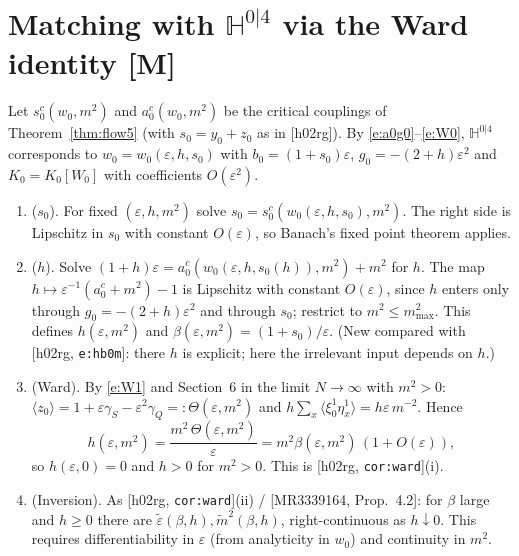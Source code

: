 \documentclass[11pt]{article}
\theoremstyle{remark}
\theoremstyle{definition}
\newcommand{\HH}{\mathbb{H}}
\newcommand{\avg}[1]{\langle #1\rangle}
\newcommand{\st}[1]{\textsf{[#1]}}
\newcommand{\hr}[1]{\textup{[h02rg, \texttt{#1}]}}
\begin{document}
\section{Matching with $\HH^{0|4}$ via the Ward identity \st{M}}

Let $s_0^c(w_0,m^2)$ and $a_0^c(w_0,m^2)$ be the critical couplings of Theorem~\ref{thm:flow5}
(with $s_0=y_0+z_0$ as in [h02rg]). By \eqref{e:a0g0}--\eqref{e:W0}, $\HH^{0|4}$ corresponds to
$w_0=w_0(\varepsilon,h,s_0)$ with $b_0=(1+s_0)\varepsilon$, $g_0=-(2+h)\varepsilon^2$ and $K_0=K_0[W_0]$ with coefficients $O(\varepsilon^2)$.

\begin{enumerate}[label=\textbf{Step \arabic*.}, leftmargin=*]
\item ($s_0$). For fixed $(\varepsilon,h,m^2)$ solve $s_0=s_0^c(w_0(\varepsilon,h,s_0),m^2)$. The right side is Lipschitz in $s_0$
  with constant $O(\varepsilon)$, so Banach's fixed point theorem applies.
\item ($h$). Solve $(1+h)\varepsilon=a_0^c(w_0(\varepsilon,h,s_0(h)),m^2)+m^2$ for $h$. The map
  $h\mapsto\varepsilon^{-1}(a_0^c+m^2)-1$ is Lipschitz with constant $O(\varepsilon)$, since $h$ enters only through
  $g_0=-(2+h)\varepsilon^2$ and through $s_0$; restrict to $m^2\le m^2_{\max}$. This defines $h(\varepsilon,m^2)$ and $\beta(\varepsilon,m^2)=(1+s_0)/\varepsilon$.
  (New compared with \hr{e:hb0m}: there $h$ is explicit; here the irrelevant input depends on $h$.)
\item (Ward). By \eqref{e:W1} and Section~6 in the limit $N\to\infty$ with $m^2>0$:
  $\avg{z_0}=1+\varepsilon\gamma_S-\varepsilon^2\gamma_Q=:\Theta(\varepsilon,m^2)$ and
  $h\sum_x\avg{\xi^1_0\eta^1_x}=h\varepsilon\,m^{-2}$. Hence
  \begin{equation}
    h(\varepsilon,m^2)=\frac{m^2\,\Theta(\varepsilon,m^2)}{\varepsilon}=m^2\beta(\varepsilon,m^2)\,(1+O(\varepsilon)),
  \end{equation}
  so $h(\varepsilon,0)=0$ and $h>0$ for $m^2>0$. This is \hr{cor:ward}(i).
\item (Inversion). As \hr{cor:ward}(ii) / [MR3339164, Prop.~4.2]: for $\beta$ large and $h\ge0$ there are
  $\tilde\varepsilon(\beta,h),\tilde m^2(\beta,h)$, right-continuous as $h\downarrow0$. This requires differentiability in $\varepsilon$
  (from analyticity in $w_0$) and continuity in $m^2$.
\end{enumerate}
\end{document}
